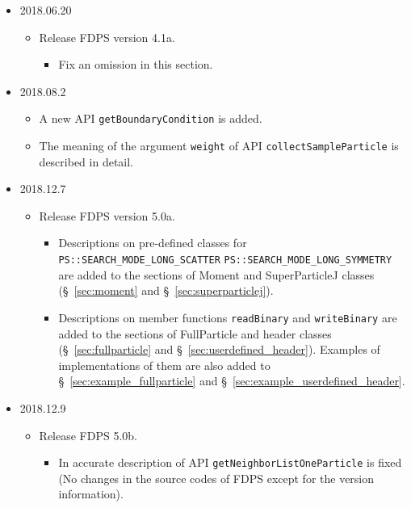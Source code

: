 \begin{itemize}
  \item 2018.06.20
    \begin{itemize}
    \item Release FDPS version 4.1a.
      \begin{itemize}
      \item Fix an omission in this section.
      \end{itemize}
    \end{itemize}

  \item 2018.08.2
    \begin{itemize}
    \item A new API \texttt{getBoundaryCondition} is added.
    \item The meaning of the argument \texttt{weight} of API \texttt{collectSampleParticle} is described in detail.
    \end{itemize}

  \item 2018.12.7
    \begin{itemize}
    \item Release FDPS version 5.0a.
       \begin{itemize}
          \item Descriptions on pre-defined classes for \newline
          \texttt{PS::SEARCH\_MODE\_LONG\_SCATTER} \newline
          \texttt{PS::SEARCH\_MODE\_LONG\_SYMMETRY} \newline
          are added to the sections of Moment and SuperParticleJ classes (\S~\ref{sec:moment} and \S~\ref{sec:superparticlej}).
          \item Descriptions on member functions \texttt{readBinary} and \texttt{writeBinary} are added to the sections of FullParticle and header classes (\S~\ref{sec:fullparticle} and \S~\ref{sec:userdefined_header}). Examples of implementations of them are also added to \S~\ref{sec:example_fullparticle} and \S~\ref{sec:example_userdefined_header}.
       \end{itemize}
    \end{itemize}

  \item 2018.12.9
    \begin{itemize}
    \item Release FDPS 5.0b.
       \begin{itemize}
          \item In accurate description of API \texttt{getNeighborListOneParticle} is fixed (No changes in the source codes of FDPS except for the version information).
       \end{itemize}
    \end{itemize}


\end{itemize}
